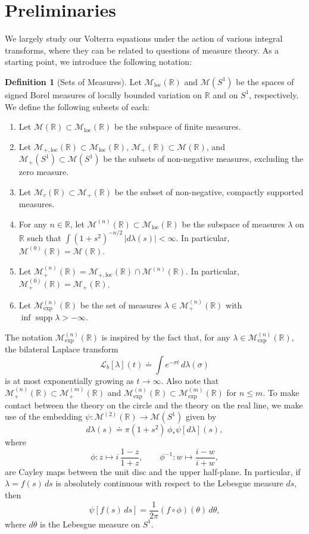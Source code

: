 \documentclass{cams-l} %
\newcommand{\dave}[1]{#1}\newcommand{\davebegin}{}\newcommand{\daveend}{}\newcommand{\george}[1]{#1}
\newcommand{\RR}{\mathbb R}
\newcommand{\cL}{\mathcal L}
\newcommand{\cM}{\mathcal M}
\newcommand{\supp}{\operatorname{supp}}
\theoremstyle{definition}
\newtheorem{definition}[theorem]{Definition}
\theoremstyle{remark}
\numberwithin{equation}{section}
\begin{document}
\section{Preliminaries}\label{sec:preliminaries}
We largely study our Volterra equations under the action of various integral transforms, where they can be related to questions of measure theory. As a starting point, we introduce the following notation:
\begin{definition}[Sets of Measures]\label{def:measures}
    Let $\cM_\mathrm{loc}(\RR)$ and $\cM(S^1)$ be the spaces of signed Borel measures of locally bounded variation on $\RR$ and on $S^1$, respectively. We define the following subsets of each:
    \begin{enumerate}
        \item Let $\cM(\RR)\subset\cM_\mathrm{loc}(\RR)$ be the subspace of finite measures.
        \item Let $\cM_{+,\mathrm{loc}}(\RR)\subset\cM_\mathrm{loc}(\RR)$, $\cM_+(\RR)\subset\cM(\RR)$, and $\cM_+(S^1)\subset\cM(S^1)$ be the subsets of non-negative measures, excluding the zero measure.
        \item Let $\cM_c(\RR)\subset\cM_+(\RR)$ be the subset of non-negative, compactly supported measures. 
        \item For any $n\in\RR$, let $\cM^{(n)}(\RR)\subset\cM_\mathrm{loc}(\RR)$ be the subspace of measures $\lambda$ on $\RR$ such that $\int (1+s^2)^{-n/2}\,|d\lambda(s)|<\infty$. In particular, $\cM^{(0)}(\RR)=\cM(\RR)$.
        \item Let $\cM_+^{(n)}(\RR)=\cM_{+,\mathrm{loc}}(\RR)\cap \cM^{(n)}(\RR)$. In particular, $\cM_+^{(0)}(\RR)=\cM_+(\RR)$.
        \item Let $\cM_\mathrm{exp}^{(n)}(\RR)$ be the set of measures $\lambda\in\cM_+^{(n)}(\RR)$ with $\inf\supp\lambda>-\infty$.
    \end{enumerate}
\end{definition}
The notation $\cM_\mathrm{exp}^{(n)}(\RR)$ is inspired by the fact that, for any $\lambda\in\cM_\mathrm{exp}^{(n)}(\RR)$, the bilateral Laplace transform 
\[\cL_b[\lambda](t)\doteq \int e^{-\sigma t}\,d\lambda(\sigma)\]
is \dave{at most exponentially growing as} $t\to\infty$. Also note that $\cM_+^{(n)}(\RR)\subset\cM_+^{(m)}(\RR)$ and $\cM_\mathrm{exp}^{(n)}(\RR)\subset\cM_\mathrm{exp}^{(m)}(\RR)$ for $n\leq m$. To make contact between the theory on the circle and the theory on the real line, we make use of the embedding $\psi:\cM^{(2)}(\RR)\to \cM(S^1)$ given by
\begin{equation}\label{eq:embedding}
    d\lambda(s) \doteq \pi(1+s^2)\,\phi_*\psi[d\lambda](s),
\end{equation}
where
\begin{equation}\label{eq:cayleymap}
    \phi:z\mapsto i\,\frac{1-z}{1+z}, \qquad \phi^{-1}:w \mapsto \frac{i - w}{i + w},
\end{equation}
are Cayley maps between the unit disc and the upper half-plane. \dave{In particular, if $\lambda = f(s)\,ds$ is absolutely continuous with respect to the Lebesgue measure $ds$, then
\[\psi[f(s)\,ds] = \frac{1}{2\pi}(f\circ\phi)(\theta)\,d\theta,\]
where $d\theta$ is the Lebesgue measure on $S^1$.}
\end{document}
